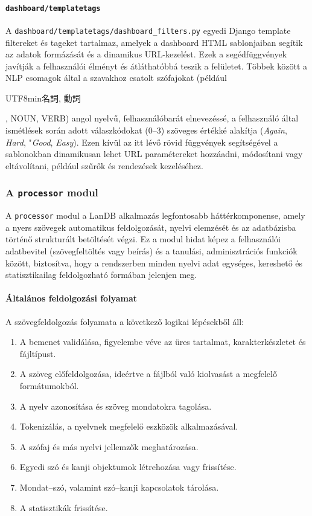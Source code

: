 \paragraph{\texttt{dashboard/templatetags}}

A \texttt{dashboard/templatetags/dashboard\_filters.py} egyedi Django template filtereket és tageket tartalmaz, amelyek a dashboard HTML sablonjaiban segítik az adatok formázását és a dinamikus URL-kezelést. Ezek a segédfüggvények javítják a felhasználói élményt és átláthatóbbá teszik a felületet. Többek között a NLP csomagok által a szavakhoz csatolt szófajokat (például \begin{CJK}{UTF8}{min}名詞, 動詞\end{CJK}, NOUN, VERB) angol nyelvű, felhasználóbarát elnevezéssé, a felhasználó által ismétlések során adott válaszkódokat (0–3) szöveges értékké alakítja (\textit{Again}, \textit{Hard}, "\textit{Good}, \textit{Easy}). Ezen kívül az itt lévő rövid függvények segítségével a sablonokban dinamikusan lehet URL paramétereket hozzáadni, módosítani vagy eltávolítani, például szűrők és rendezések kezeléséhez.

\subsubsection{A \texttt{processor} modul}

A \texttt{processor} modul a LanDB alkalmazás legfontosabb háttérkomponense, amely a nyers szövegek automatikus feldolgozását, nyelvi elemzését és az adatbázisba történő strukturált betöltését végzi. Ez a modul hidat képez a felhasználói adatbevitel (szövegfeltöltés vagy beírás) és a tanulási, adminisztrációs funkciók között, biztosítva, hogy a rendszerben minden nyelvi adat egységes, kereshető és statisztikailag feldolgozható formában jelenjen meg.

\paragraph{Általános feldolgozási folyamat}

A szövegfeldolgozás folyamata a következő logikai lépésekből áll:

\begin{enumerate}
    \item A bemenet validálása, figyelembe véve az üres tartalmat, karakterkészletet és fájltípust.
    \item A szöveg előfeldolgozása, ideértve a fájlból való kiolvasást a megfelelő formátumokból.
    \item A nyelv azonosítása és szöveg mondatokra tagolása.
    \item Tokenizálás, a nyelvnek megfelelő eszközök alkalmazásával.
    \item A szófaj és más nyelvi jellemzők meghatározása.
    \item Egyedi szó és kanji objektumok létrehozása vagy frissítése.
    \item Mondat–szó, valamint szó–kanji kapcsolatok tárolása.
    \item A statisztikák frissítése.
\end{enumerate}

